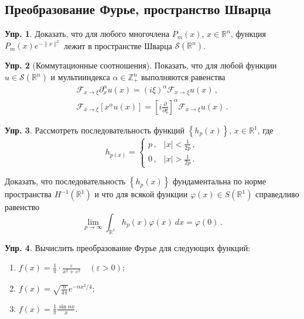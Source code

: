 \documentclass[a4paper, 12pt]{article}
\theoremstyle{definition}
\newtheorem{exercise}{Упр.}
\begin{document}
\subsection{Преобразование Фурье, пространство Шварца} %

\begin{exercise} %
    Доказать, что для любого многочлена \({ P_{m}(x) }\), \({ x \in \mathbb R^{n} }\), функция \({ P_{m}(x) e^{-\lVert x \rVert^2} }\) лежит в пространстве Шварца \({ \mathcal S(\mathbb R^{n}) }\).
\end{exercise}

\begin{exercise}[Коммутационные соотношения]
    Показать, что для любой функции \({ u \in \mathcal S(\mathbb R^{n}) }\) и мультииндекса \({ \alpha \in \mathbb Z_{+}^{n} }\) выполняются равенства
    \[
        \begin{gathered}
            \mathcal F_{x \to \xi} \partial_{x}^{\alpha} u(x) = (i\xi)^{\alpha} \mathcal F_{x \to \xi} u(x)\,, \\
            \mathcal F_{x \to \xi} \left[ x^{\alpha} u(x) \right] = \left[ i \frac{\partial}{\partial \xi} \right]^{\alpha} \mathcal F_{x \to \xi}u(x)\,.
        \end{gathered}
    \]
\end{exercise}

\begin{exercise} %
    Рассмотреть последовательность функций \({ \left\{ h_{p}(x) \right\} }\), \({ x \in \mathbb R^{1} }\), где \[
        h_{p(x)} = \begin{cases}
            p\,, & \lvert x \rvert < \frac{1}{2p}\,, \\
            0\,, & \lvert x \rvert > \frac{1}{2p}\,.
        \end{cases}
    \]

    Доказать, что последовательность \({ \left\{ h_{p}(x) \right\} }\) фундаментальна по норме пространства \({ H^{-1}(\mathbb R^{1}) }\) и что для всякой функции \({ \varphi(x) \in S(\mathbb R^{1}) }\) справедливо равенство \[
        \lim_{p \to \infty} \int_{\mathbb R^{1}} h_{p}(x) \varphi(x)\: dx = \varphi(0)\,.
    \]
\end{exercise}

\begin{exercise} %
    Вычислить преобразование Фурье для следующих функций:
    \begin{enumerate}
        \item \({ \displaystyle f(x) = \frac{1}{\pi} \cdot \frac{\varepsilon}{x^2 + \varepsilon^2} \quad (\varepsilon > 0) }\);
        \item \({ \displaystyle f(x) = \sqrt{\frac{n}{4\pi}} e^{-n x^2 / 4} }\);
        \item \({ \displaystyle f(x) = \frac{1}{\pi} \frac{\sin nx}{x} }\).
    \end{enumerate}
\end{exercise}
\end{document}
